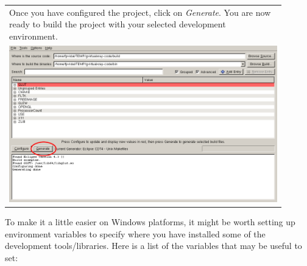 \documentclass[11pt,oneside,a4paper,final]{article}
\begin{document}
\begin{center}
\begin{longtable}{|p{0.9\linewidth}|}
		Once you have configured the project, click on \emph{Generate}.
		You are now ready to build the project with your selected development environment.\\
		\includegraphics[width=0.5\linewidth]{cmake-08}\\
		\hline
	\end{longtable}
\end{center}

To make it a little easier on Windows platforms, it might be worth setting up environment variables to specify where you have installed some of the development tools/libraries. 
Here is a list of the variables that may be useful to set:
\end{document}
